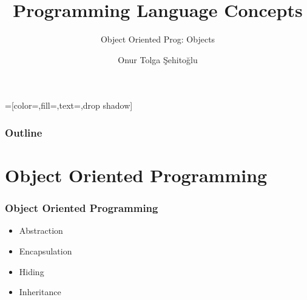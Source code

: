 \usepackage{etex}
\usepackage{tikz}
\usetikzlibrary{shapes,arrows,positioning,calc,shadows,matrix,fit}
\usepackage{pgf-umlcd}
=[color=\umldrawcolor,fill=\umlfillcolor,text=\umltextcolor,drop shadow]
\usepackage[utf8]{inputenc}
\usepackage{listings}
\usepackage{multicol}

\def\circtxt#1{$\mathalpha \bigcirc \mkern-13mu \mathtt #1$}
\def\NO{{\color{red!60!black}$\times$}}
\def\OK{{\color{green!60!black}$\surd$}}

{
  \usepackage{fullpage}
  \usepackage{pgf}
  \usepackage{hyperref}
}

{

}


\title{Programming Language Concepts}
\subtitle{Object Oriented Prog: Objects}
\author{Onur Tolga Şehitoğlu}
\subject{Object Oriented Prog: Objects}
\date{}
	\titlegraphic{\insertmetutitle\insertlicense}



%
%
%
%

 \frame[plain]{\maketitle}
 \begin{frame}
 \frametitle{Outline}
 \begin{multicols}{2}
 \tableofcontents
 \end{multicols}
 \end{frame}

\section{Object Oriented Programming}
\begin{frame}
\frametitle{Object Oriented Programming}
\begin{itemize}
\item Abstraction
\item Encapsulation
\item Hiding
\item Inheritance
\end{itemize}
\end{frame}

